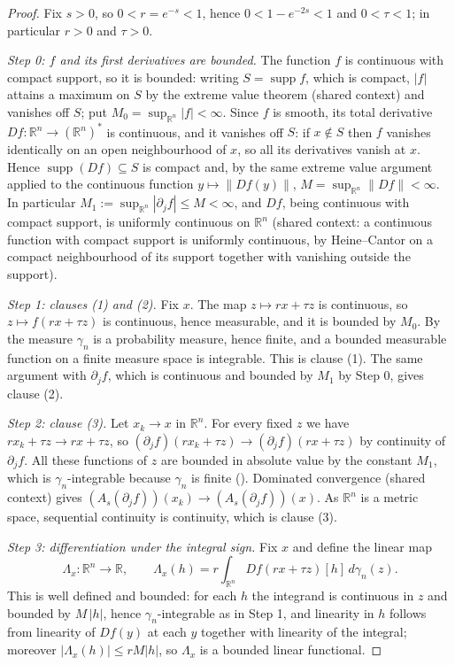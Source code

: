\begin{proof}
Fix $s>0$, so $0 < r = e^{-s} < 1$, hence $0 < 1-e^{-2s} < 1$ and
$0 < \tau < 1$; in particular $r > 0$ and $\tau > 0$.

\emph{Step 0: $f$ and its first derivatives are bounded.}
The function $f$ is continuous with compact support, so it is bounded: writing
$S = \operatorname{supp} f$, which is compact, $|f|$ attains a maximum on $S$ by
the extreme value theorem (shared context) and vanishes off $S$; put
$M_0 = \sup_{\mathbb{R}^n}|f| < \infty$.  Since $f$ is smooth, its total
derivative $Df : \mathbb{R}^n \to (\mathbb{R}^n)^*$ is continuous, and it
vanishes off $S$: if $x \notin S$ then $f$ vanishes identically on an open
neighbourhood of $x$, so all its derivatives vanish at $x$.  Hence
$\operatorname{supp}(Df) \subseteq S$ is compact and, by the same extreme value
argument applied to the continuous function $y \mapsto \|Df(y)\|$,
$M = \sup_{\mathbb{R}^n}\|Df\| < \infty$.  In particular
$M_1 := \sup_{\mathbb{R}^n}|\partial_j f| \leq M < \infty$, and $Df$, being
continuous with compact support, is uniformly continuous on $\mathbb{R}^n$
(shared context: a continuous function with compact support is uniformly
continuous, by Heine--Cantor on a compact neighbourhood of its support together
with vanishing outside the support).

\emph{Step 1: clauses (1) and (2).}
Fix $x$.  The map $z \mapsto rx+\tau z$ is continuous, so $z \mapsto f(rx+\tau z)$
is continuous, hence measurable, and it is bounded by $M_0$.  By
 the measure $\gamma_n$ is a probability measure, hence
finite, and a bounded measurable function on a finite measure space is
integrable.  This is clause (1).  The same argument with $\partial_j f$, which is
continuous and bounded by $M_1$ by Step 0, gives clause (2).

\emph{Step 2: clause (3).}
Let $x_k \to x$ in $\mathbb{R}^n$.  For every fixed $z$ we have
$rx_k + \tau z \to rx+\tau z$, so $(\partial_j f)(rx_k+\tau z) \to
(\partial_j f)(rx+\tau z)$ by continuity of $\partial_j f$.  All these functions
of $z$ are bounded in absolute value by the constant $M_1$, which is
$\gamma_n$-integrable because $\gamma_n$ is finite ().
Dominated convergence (shared context) gives
$(A_s(\partial_j f))(x_k) \to (A_s(\partial_j f))(x)$.  As $\mathbb{R}^n$ is a
metric space, sequential continuity is continuity, which is clause (3).

\emph{Step 3: differentiation under the integral sign.}
Fix $x$ and define the linear map
\[
  \Lambda_x : \mathbb{R}^n \to \mathbb{R},
  \qquad
  \Lambda_x(h) = r\int_{\mathbb{R}^n} Df(rx+\tau z)[h] \, d\gamma_n(z) .
\]
This is well defined and bounded: for each $h$ the integrand is continuous in
$z$ and bounded by $M\,|h|$, hence $\gamma_n$-integrable as in Step 1, and
linearity in $h$ follows from linearity of $Df(y)$ at each $y$ together with
linearity of the integral; moreover $|\Lambda_x(h)| \leq rM|h|$, so $\Lambda_x$
is a bounded linear functional.


\end{proof}
